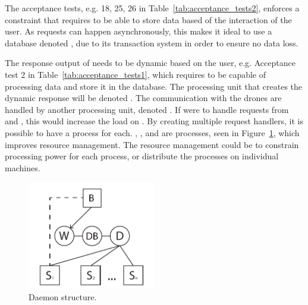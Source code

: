 The acceptance tests, e.g. 18, 25, 26 in Table~\ref{tab:acceptance_tests2}, enforces a constraint that requires  to be able to store data based of the interaction of the user.
As requests can happen asynchronously, this makes it ideal to use a database denoted , due to its transaction system in order to ensure no data loss.

The response output of  needs to be dynamic based on the user, e.g. Acceptance test 2 in Table~\ref{tab:acceptance_tests1}, which requires  to be capable of processing data and store it in the database.
The processing unit that creates the dynamic response will be denoted .
The communication with the drones are handled by another processing unit, denoted .
If  were to handle requests from  and , this would increase the load on .
By creating multiple request handlers, it is possible to have a process for each. , , and  are processes, seen in Figure~\ref{fig:daemon_structure}, which improves resource management.
The resource management could be to constrain processing power for each process, or distribute the processes on individual machines.

\begin{figure}[htb]
    \centering
    \includegraphics[width=0.5\textwidth]{gfx/daemon_structure.pdf}
    \caption{Daemon structure.}
    \label{fig:daemon_structure}
\end{figure}


